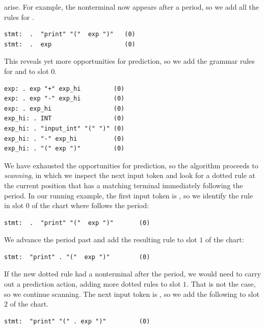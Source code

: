 \documentclass[7x10]{TimesAPriori_MIT}%
\numberwithin{theorem}{chapter}
\numberwithin{definition}{chapter}
\numberwithin{equation}{chapter}
\begin{document}
{arise. For example, the  nonterminal now appears after a
period, so we add all the rules for .
\begin{lstlisting}
stmt:  .  "print" "("  exp ")"   (0)
stmt:  .  exp                    (0)
\end{lstlisting}
This reveals yet more opportunities for prediction, so we add the grammar
rules for  and  to slot $0$.
\begin{lstlisting}[escapechar=$]
exp: . exp "+" exp_hi         (0)
exp: . exp "-" exp_hi         (0)
exp: . exp_hi                 (0)
exp_hi: . INT                 (0)
exp_hi: . "input_int" "(" ")" (0)
exp_hi: . "-" exp_hi          (0)
exp_hi: . "(" exp ")"         (0)
\end{lstlisting}

We have exhausted the opportunities for prediction, so the algorithm
proceeds to \emph{scanning}, in which we inspect the next input token
and look for a dotted rule at the current position that has a matching
terminal immediately following the period. In our running example, the
first input token is , so we identify the rule in slot
$0$ of the chart where  follows the period:
\begin{lstlisting}
stmt:  .  "print" "("  exp ")"       (0)
\end{lstlisting}
We advance the period past  and add the resulting rule
to slot $1$ of the chart:
\begin{lstlisting}
stmt:  "print" . "("  exp ")"        (0)
\end{lstlisting}
If the new dotted rule had a nonterminal after the period, we would
need to carry out a prediction action, adding more dotted rules to
slot $1$. That is not the case, so we continue scanning. The next
input token is , so we add the following to slot $2$ of the
chart.
\begin{lstlisting}
stmt:  "print" "(" . exp ")"         (0)
\end{lstlisting}

}
\end{document}
